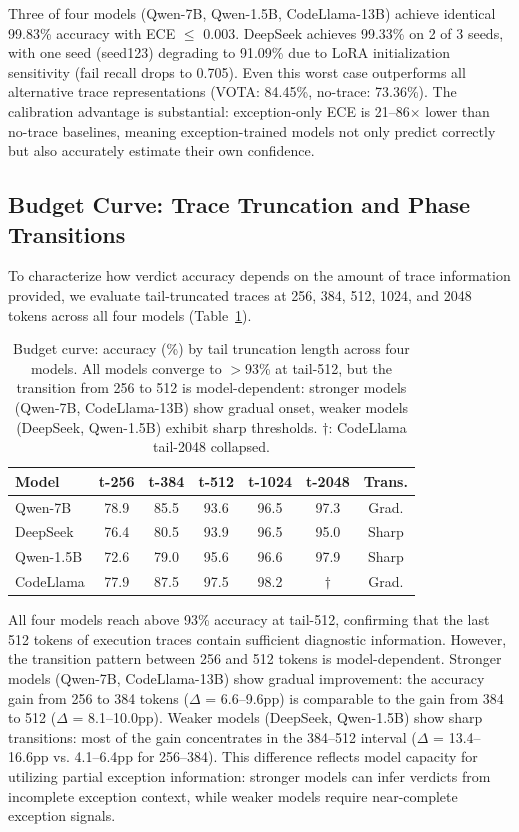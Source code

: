 \documentclass[11pt,a4paper]{article}
\begin{document}
Three of four models (Qwen-7B, Qwen-1.5B, CodeLlama-13B) achieve identical 99.83\% accuracy with ECE $\leq$ 0.003. DeepSeek achieves 99.33\% on 2 of 3 seeds, with one seed (seed123) degrading to 91.09\% due to LoRA initialization sensitivity (fail recall drops to 0.705). Even this worst case outperforms all alternative trace representations (VOTA: 84.45\%, no-trace: 73.36\%). The calibration advantage is substantial: exception-only ECE is 21--86$\times$ lower than no-trace baselines, meaning exception-trained models not only predict correctly but also accurately estimate their own confidence.

\subsection{Budget Curve: Trace Truncation and Phase Transitions}
\label{sec:budget}

To characterize how verdict accuracy depends on the amount of trace information provided, we evaluate tail-truncated traces at 256, 384, 512, 1024, and 2048 tokens across all four models (Table~\ref{tab:budget}).

\begin{table}[t]
\centering
\small
\setlength{\tabcolsep}{3pt}
\begin{tabular}{lcccccc}
\toprule
\textbf{Model} & \textbf{t-256} & \textbf{t-384} & \textbf{t-512} & \textbf{t-1024} & \textbf{t-2048} & \textbf{Trans.} \\
\midrule
Qwen-7B & 78.9 & 85.5 & 93.6 & 96.5 & 97.3 & Grad. \\
DeepSeek & 76.4 & 80.5 & 93.9 & 96.5 & 95.0 & Sharp \\
Qwen-1.5B & 72.6 & 79.0 & 95.6 & 96.6 & 97.9 & Sharp \\
CodeLlama & 77.9 & 87.5 & 97.5 & 98.2 & $\dagger$ & Grad. \\
\bottomrule
\end{tabular}
\caption{Budget curve: accuracy (\%) by tail truncation length across four models. All models converge to $>$93\% at tail-512, but the transition from 256 to 512 is model-dependent: stronger models (Qwen-7B, CodeLlama-13B) show gradual onset, weaker models (DeepSeek, Qwen-1.5B) exhibit sharp thresholds. $\dagger$: CodeLlama tail-2048 collapsed.}
\label{tab:budget}
\end{table}

All four models reach above 93\% accuracy at tail-512, confirming that the last 512 tokens of execution traces contain sufficient diagnostic information. However, the transition pattern between 256 and 512 tokens is model-dependent. Stronger models (Qwen-7B, CodeLlama-13B) show gradual improvement: the accuracy gain from 256 to 384 tokens ($\Delta$ = 6.6--9.6pp) is comparable to the gain from 384 to 512 ($\Delta$ = 8.1--10.0pp). Weaker models (DeepSeek, Qwen-1.5B) show sharp transitions: most of the gain concentrates in the 384--512 interval ($\Delta$ = 13.4--16.6pp vs. 4.1--6.4pp for 256--384). This difference reflects model capacity for utilizing partial exception information: stronger models can infer verdicts from incomplete exception context, while weaker models require near-complete exception signals.
\end{document}
